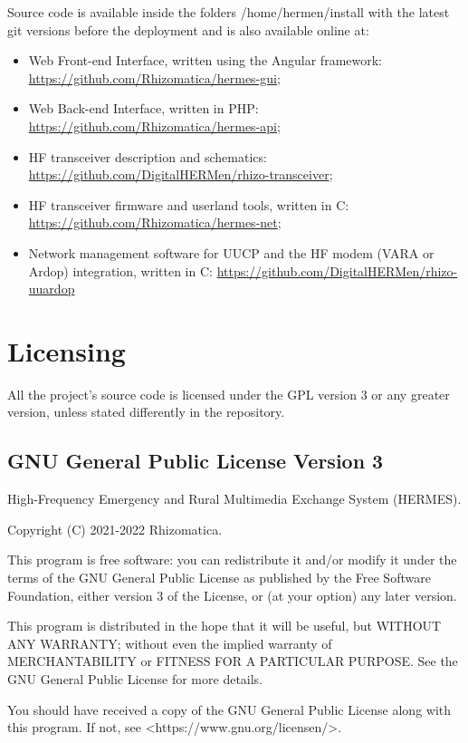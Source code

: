 \documentclass[11pt,a4paper]{article}
\begin{document}
    Source code is available inside the folders /home/hermen/install with the latest git versions before the deployment and is also available online at:
\begin{itemize}
    \item Web Front-end Interface, written using the Angular framework: \url{https://github.com/Rhizomatica/hermes-gui};
    \item Web Back-end Interface, written in PHP: \url{https://github.com/Rhizomatica/hermes-api}; 
    \item HF transceiver description and schematics: \url{https://github.com/DigitalHERMen/rhizo-transceiver};
    \item HF transceiver firmware and userland tools, written in C:
    \url{https://github.com/Rhizomatica/hermes-net};
    \item Network management software for UUCP and the HF modem (VARA or Ardop) integration, written in C:
    \url{https://github.com/DigitalHERMen/rhizo-uuardop}
\end{itemize}


\section{Licensing}
\label{apx_license}

    All the project's source code is licensed under the GPL version 3 or any greater version, unless stated differently in the repository.

\subsection{GNU General Public License Version 3}

    High-Frequency Emergency and Rural Multimedia Exchange System (HERMES).

    Copyright (C) 2021-2022 Rhizomatica.
\newline

    This program is free software: you can redistribute it and/or modify
    it under the terms of the GNU General Public License as published by
    the Free Software Foundation, either version 3 of the License, or
    (at your option) any later version.

    This program is distributed in the hope that it will be useful,
    but WITHOUT ANY WARRANTY; without even the implied warranty of
    MERCHANTABILITY or FITNESS FOR A PARTICULAR PURPOSE.  See the
    GNU General Public License for more details.

    You should have received a copy of the GNU General Public License
    along with this program.  If not, see <https://www.gnu.org/licensen/>.
    
\end{document}
